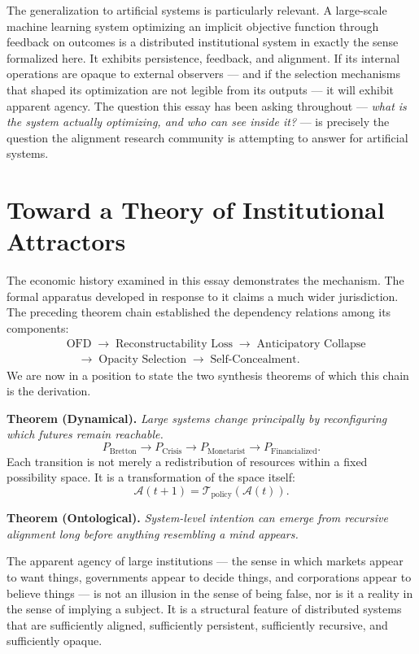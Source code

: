 \documentclass[12pt, a4paper]{article}
\theoremstyle{named}
\begin{document}
The generalization to artificial systems is particularly relevant. A
large-scale machine learning system optimizing an implicit objective
function through feedback on outcomes is a distributed institutional
system in exactly the sense formalized here. It exhibits persistence,
feedback, and alignment. If its internal operations are opaque to
external observers — and if the selection mechanisms that shaped its
optimization are not legible from its outputs — it will exhibit
apparent agency. The question this essay has been asking throughout —
\emph{what is the system actually optimizing, and who can see inside
it?} — is precisely the question the alignment research community is
attempting to answer for artificial systems.

\section{Toward a Theory of Institutional Attractors}

The economic history examined in this essay demonstrates the mechanism.
The formal apparatus developed in response to it claims a much wider
jurisdiction. The preceding theorem chain established the dependency
relations among its components:
\[
\begin{aligned}
  &\text{OFD}
  \;\to\; \text{Reconstructability Loss}
  \;\to\; \text{Anticipatory Collapse} \\
  &\quad\to\; \text{Opacity Selection}
  \;\to\; \text{Self-Concealment.}
\end{aligned}
\]
We are now in a position to state the two synthesis theorems of which
this chain is the derivation.

\begin{thmbox}
\textbf{Theorem (Dynamical).} \emph{Large systems change principally by
reconfiguring which futures remain reachable.}
\[
  P_{\text{Bretton}}
  \to P_{\text{Crisis}}
  \to P_{\text{Monetarist}}
  \to P_{\text{Financialized}}.
\]
Each transition is not merely a redistribution of resources within a
fixed possibility space. It is a transformation of the space itself:
\[
  \mathcal{A}(t+1) = \mathcal{T}_{\text{policy}}(\mathcal{A}(t)).
\]
\end{thmbox}

\begin{thmbox}
\textbf{Theorem (Ontological).} \emph{System-level intention can emerge
from recursive alignment long before anything resembling a mind
appears.}

The apparent agency of large institutions — the sense in which markets
appear to want things, governments appear to decide things, and
corporations appear to believe things — is not an illusion in the sense
of being false, nor is it a reality in the sense of implying a
subject. It is a structural feature of distributed systems that are
sufficiently aligned, sufficiently persistent, sufficiently recursive,
and sufficiently opaque.
\end{thmbox}
\end{document}

